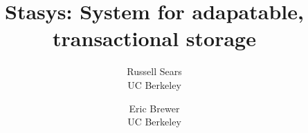 \documentclass[letterpaper,twocolumn,10pt]{article}
\newcommand{\yad}{Stasys\xspace}
\begin{document}
\date{}


\title{\Large \bf \yad: System for adapatable, transactional storage}

\author{
{\rm Russell Sears}\\
UC Berkeley
\and
{\rm Eric Brewer}\\
UC Berkeley
} %

\maketitle



\end{document}
